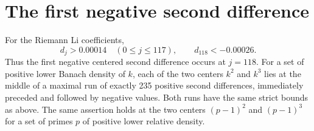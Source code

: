 \section{The first negative second difference}
\label{sec:first-change}

\begin{theorem}\label{thm:firstchange}
For the Riemann Li coefficients,
\[
 d_j>0.00014\quad (0\le j\le117),\qquad d_{118}<-0.00026.
\]
Thus the first negative centered second difference occurs at $j=118$.
For a set of positive lower Banach density of $k$, each of the two
centers $k^2$ and $k^3$ lies at the middle of a maximal run of exactly
235 positive second differences, immediately preceded and followed by
negative values. Both runs have the same strict bounds as above.
The same assertion holds at the two centers $(p-1)^2$ and $(p-1)^3$
for a set of primes $p$ of positive lower relative density.
\end{theorem}

